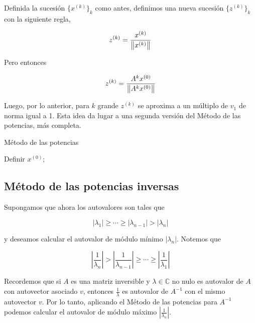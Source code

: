 Definida la sucesión $\{x^{(k)}\}_k$ como antes, definimos una nueva sucesión $\{z^{(k)}\}_k$ con la siguiente regla,

\[z^{(k)} = \frac{x^{(k)}}{\left\lVert x^{(k)}\right\rVert}\]

Pero entonces

\[z^{(k)} = \frac{A^k x^{(0)}}{\left\lVert A^k x^{(0)}\right\rVert}\]

Luego, por lo anterior, para $k$ grande $z^{(k)}$ se aproxima a un múltiplo de $v_1$ de norma igual a 1. Esta idea da lugar a una segunda versión del Método de las potencias, más completa.

\begin{algorithm}
\caption[]{Método de las potencias}
Definir $x^{(0)}$;\\
\end{algorithm}

\subsection{Método de las potencias inversas}

Supongamos que ahora los autovalores son tales que

\[|\lambda_1| \geq \cdots \geq |\lambda_{n - 1}| > |\lambda_n|\]

y deseamos calcular el autovalor de módulo mínimo $|\lambda_n|$. Notemos que

\[\left|\frac{1}{\lambda_n}\right| > \left|\frac{1}{\lambda_{n - 1}}\right| \geq \cdots \geq \left|\frac{1}{\lambda_1}\right| \]

Recordemos que si $A$ es una matriz inversible y $\lambda \in \mathbb{C}$ no nulo es autovalor de $A$ con autovector asociado $v$, entonces $\frac{1}{\lambda}$ es autovalor de $A^{-1}$ con el mismo autovector $v$. Por lo tanto, aplicando el Método de las potencias para $A^{-1}$ podemos calcular el autovalor de módulo máximo $\left|\frac{1}{\lambda_n}\right|$.
